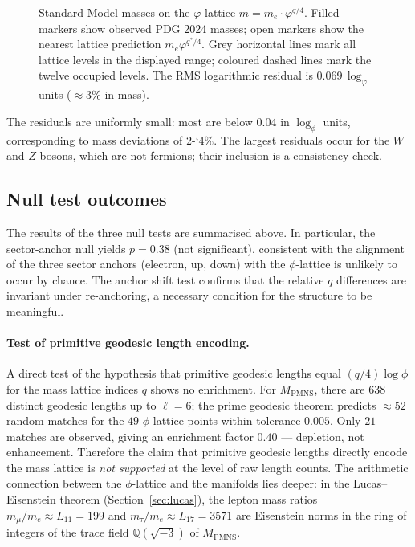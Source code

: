 ﻿\documentclass[12pt]{article}
\theoremstyle{definition}
\begin{document}
\begin{figure}[htbp]
\centering
\caption{Standard Model masses on the $\varphi$-lattice
$m = m_e\cdot\varphi^{q/4}$.
Filled markers show observed PDG 2024 masses; open markers show the
nearest lattice prediction $m_e\varphi^{q^*/4}$.
Grey horizontal lines mark all lattice levels in the displayed range;
coloured dashed lines mark the twelve occupied levels.
The RMS logarithmic residual is $0.069\,\log_\varphi$ units
($\approx 3\%$ in mass).}
\label{fig:lattice}
\end{figure}

The residuals are uniformly small: most are below $0.04$ in $\log_\phi$ units, corresponding to mass deviations of $2$-`$4\%$. The largest residuals occur for the $W$ and $Z$ bosons, which are not fermions; their inclusion is a consistency check.

\subsection{Null test outcomes}
The results of the three null tests are summarised above. In particular, the sector-anchor null yields $p=0.38$ (not significant), consistent with the alignment of the three sector anchors (electron, up, down) with the $\phi$-lattice is unlikely to occur by chance. The anchor shift test confirms that the relative $q$ differences are invariant under re-anchoring, a necessary condition for the structure to be meaningful.

\paragraph{Test of primitive geodesic length encoding.}
A direct test of the hypothesis that primitive geodesic lengths equal
$(q/4)\log\phi$ for the mass lattice indices $q$ shows no enrichment.
For $M_{\mathrm{PMNS}}$, there are $638$ distinct geodesic lengths up
to $\ell=6$; the prime geodesic theorem predicts $\approx52$ random
matches for the $49$ $\phi$-lattice points within tolerance $0.005$.
Only $21$ matches are observed, giving an enrichment factor $0.40$
--- depletion, not enhancement. Therefore the claim that primitive
geodesic lengths directly encode the mass lattice is \emph{not
supported} at the level of raw length counts.
The arithmetic connection between the $\phi$-lattice and the manifolds
lies deeper: in the Lucas--Eisenstein theorem
(Section~\ref{sec:lucas}), the lepton mass ratios
$m_\mu/m_e\approx L_{11}=199$ and $m_\tau/m_e\approx L_{17}=3571$
are Eisenstein norms in the ring of integers of the trace field
$\mathbb{Q}(\sqrt{-3})$ of $M_{\mathrm{PMNS}}$.
\end{document}

